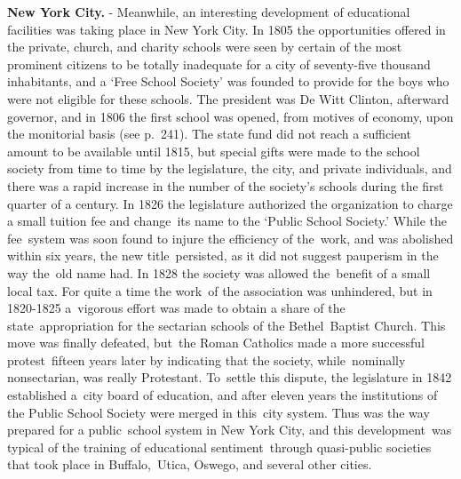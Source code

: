 \documentclass[]{book}
\begin{document}
\textbf{New York City.} - Meanwhile, an interesting development of educational facilities was taking place in New York City. In 1805 the opportunities offered in the private, church, and charity schools were seen by certain of the most prominent citizens to be totally inadequate for a city of seventy-five thousand inhabitants, and a `Free School Society' was founded to provide for the boys who were not eligible for these schools. The president was De Witt Clinton, afterward governor, and in 1806 the first school was opened, from motives of economy, upon the monitorial basis (see p.~241). The state fund did not reach a sufficient amount to be available until 1815, but special gifts were made to the school society from time to time by the legislature, the city, and private individuals, and there was a rapid increase in the number of the society's schools during the first quarter of a century. In 1826 the legislature authorized the organization to charge a small tuition fee and change~its name to the `Public School Society.' While the fee~system was soon found to injure the efficiency of the~work, and was abolished within six years, the new title~persisted, as it did not suggest pauperism in the way the~old name had. In 1828 the society was allowed the~benefit of a small local tax. For quite a time the work~of the association was unhindered, but in 1820-1825 a~vigorous effort was made to obtain a share of the state~appropriation for the sectarian schools of the Bethel~Baptist Church. This move was finally defeated, but~the Roman Catholics made a more successful protest~fifteen years later by indicating that the society, while~nominally nonsectarian, was really Protestant. To~settle this dispute, the legislature in 1842 established a~city board of education, and after eleven years the institutions of the Public School Society were merged in this~city system. Thus was the way prepared for a public~school system in New York City, and this development~was typical of the training of educational sentiment~through quasi-public societies that took place in Buffalo,~Utica, Oswego, and several other cities.
\end{document}
